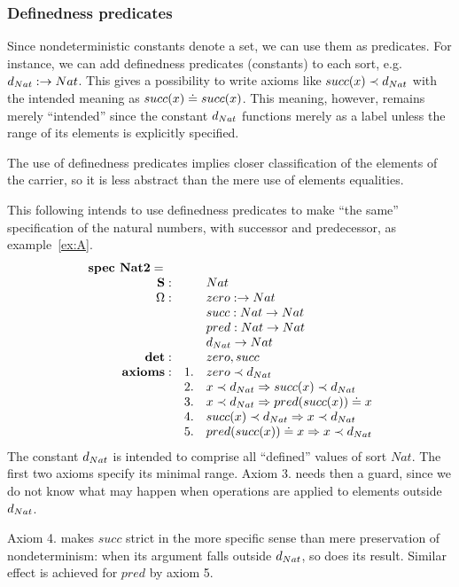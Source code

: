\documentclass[10pt]{article}
\begin{document}
\subsubsection{Definedness predicates}\label{subsub:dp}
Since  nondeterministic constants denote a set, we  can use them as
predicates. For instance, we can  add definedness 
predicates (constants) to each sort, e.g. $d_{Nat}:\to Nat$. 
This gives a possibility to write axioms like
$succ(x) \prec d_{Nat}$ with the intended meaning as $succ(x) \mathrel{\dot{=} }
succ(x)$. This meaning, however,  remains merely ``intended'' since the
constant $d_{Nat}$  functions merely as a label unless the range of its
elements is explicitly specified.

The use of definedness predicates implies closer classification of the
elements of the carrier,  so it is less abstract than the mere use of
elements equalities.


\begin{example}\label{ex:AB}
This following intends to use definedness predicates to make ``the same''
specification of the natural numbers, with successor and predecessor, as
example~\ref{ex:A}.
 \[ \begin{array}{r@{\hspace*{1em}}llll}
 \mbox{\bf spec\ Nat2} =\ \ \\
	\Sorts:	
		&& Nat \\			
	\Ops: 	
		&& zero: \to Nat\\
		&& succ: Nat \to Nat\\
		&& pred: Nat \to Nat\\	
		&& \ok{Nat} \to Nat\\
	{\bf det}:
		&& zero, succ \\
	{\bf axioms}:
		&1.& zero \prec \ok{Nat}\\
		&2.& x\prec \ok{Nat} \To succ(x) \prec \ok{Nat} \\
		&3.& x \prec \ok{Nat} \To  pred(succ(x)) \eleq  x\\
		&4.& succ(x) \prec \ok{Nat} \To x \prec \ok{Nat} \\
		&5.& pred(succ(x)) \eleq  x \To x \prec \ok{Nat} 
\end{array} \] 
The constant $d_{Nat}$ is intended to comprise all ``defined'' values of
sort $Nat$. The first two axioms specify its minimal range. Axiom 3. needs
then a guard, since we do not know what may happen when operations are
applied to elements outside $d_{Nat}$.

Axiom 4. makes $succ$ strict in the more specific sense than mere
preservation of nondeterminism: when its argument
falls outside $d_{Nat}$, so does its result. Similar effect is achieved for
$pred$ by axiom 5.
\end{example}
\end{document}
